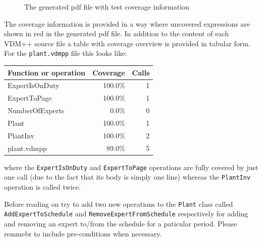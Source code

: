 \begin{figure}[tb]
\begin{center}
\end{center}
\caption{The generated pdf file with test coverage information\label{fig:testcov}}
\end{figure}

The coverage information is provided in a way where uncovered
expressions are shown in red in the generated pdf file. In addition
to the content of each VDM++ source file a table with coverage
overview is provided in tabular form. For the \texttt{plant.vdmpp}
file this looks like:

\begin{longtable}{|l|r|r|}
\hline
Function or operation & Coverage & Calls \\
\hline
\hline
ExpertIsOnDuty & 100.0\% & 1 \\
\hline
ExpertToPage & 100.0\% & 1 \\
\hline
NumberOfExperts & 0.0\% & 0 \\
\hline
Plant & 100.0\% & 1 \\
\hline
PlantInv & 100.0\% & 2 \\
\hline
\hline
plant.vdmpp & 89.0\% & 5 \\
\hline
\end{longtable}

\noindent where the \texttt{ExpertIsOnDuty} and \texttt{ExpertToPage}
operations are fully covered by just one call (due to the fact that
its body is simply one line) whereas the \texttt{PlantInv} operation
is called twice.

\begin{myhardexercise}\label{ex:addingfunctionality}
Before reading on try to add two new operations to the \texttt{Plant}
class called \texttt{AddExpertToSchedule} and
\texttt{RemoveExpertFromSchedule} respectively for adding and removing
an expert to/from the schedule for a paticular period. Please remmebr
to include pre-conditions when necessary.
\end{myhardexercise}

